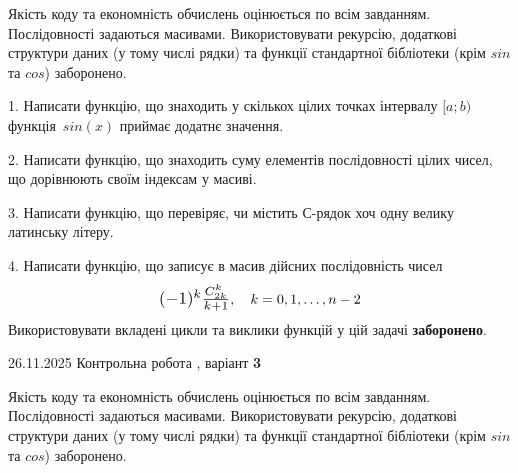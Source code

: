\documentclass[11pt, ukrainian]{article}
\begin{document}
{{
Якість коду та економність обчислень оцінюється по всім завданням. Послідовності задаються масивами. Використовувати рекурсію, додаткові структури даних (у тому числі рядки) та функції стандартної бібліотеки (крім $sin$ та $cos$) заборонено.

\vspace{2mm}

\begin {large}
1. Написати функцію, що знаходить у скількох цілих точках інтервалу $[a; b)$ функція~$sin(x)$ приймає додатнє значення.

\vspace{2mm}


2. Написати функцію, що знаходить суму елементів послідовності цілих чисел, що дорівнюють своїм індексам у масиві.

\vspace{2mm}


3. Написати функцію, що перевіряє, чи містить С-рядок хоч одну велику латинську літеру.

\vspace{2mm}


4. 
Написати функцію, що записує в масив дійсних послідовність чисел
$$\scalebox{1.2}{$(-1)^{k}\frac{C_{2k}^k}{k+1}$}, \quad k=0,1,\ldots,n-2$$
\quad Використовувати вкладені цикли та виклики функцій у цій задачі \textbf{заборонено}.

\vspace{2mm}

\end{large}
\vspace{20mm}


{{26.11.2025 Контрольна робота , варіант  \No \textbf { 3 }\par}}


{
Якість коду та економність обчислень оцінюється по всім завданням. Послідовності задаються масивами. Використовувати рекурсію, додаткові структури даних (у тому числі рядки) та функції стандартної бібліотеки (крім $sin$ та $cos$) заборонено.

}}}
\end{document}
